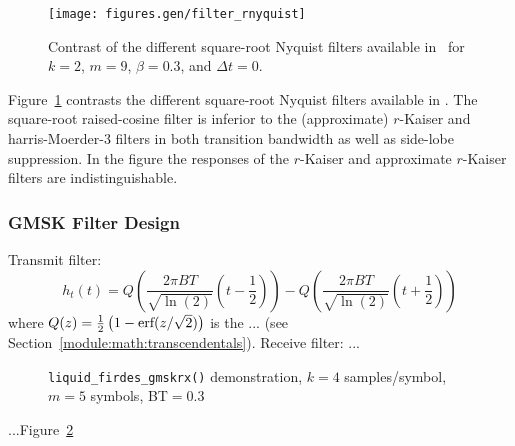 \begin{figure}
\centering
  \texttt{[image: figures.gen/filter\_rnyquist]}
\caption{Contrast of the different square-root Nyquist filters
         available in \liquid\ for
         $k=2$, $m=9$, $\beta=0.3$, and $\Delta t = 0$.}
\label{fig:module:filter:rnyquist}
\end{figure}
%
Figure~\ref{fig:module:filter:rnyquist} contrasts the different
square-root Nyquist filters available in \liquid.
The square-root raised-cosine filter is inferior to the
(approximate) $r$-Kaiser and harris-Moerder-3 filters in both transition
bandwidth as well as side-lobe suppression.
In the figure the responses of the $r$-Kaiser and approximate $r$-Kaiser
filters are indistinguishable.


\subsubsection{GMSK Filter Design}
\label{module:filter:firdes_gmsk}

%
Transmit filter:
\[
    h_t(t) = Q\left( \frac{2 \pi BT}{\sqrt{\ln(2)}} \left(t-\frac{1}{2}\right) \right) -
             Q\left( \frac{2 \pi BT}{\sqrt{\ln(2)}} \left(t+\frac{1}{2}\right) \right)
\]
%
where $Q(z)=\frac{1}{2}\left(1 - \textup{erf}(z/\sqrt{2})\right)$
is the ... (see Section~\ref{module:math:transcendentals}).
%
Receive filter: ...
%
\begin{figure}
\centering
{}
\caption{{\tt liquid\_firdes\_gmskrx()} demonstration,
         $k=4$ samples/symbol, $m=5$ symbols, BT$=0.3$}
\label{fig:module:filter:firdes_gmskrx}
\end{figure}
%
...Figure~\ref{fig:module:filter:firdes_gmskrx}

